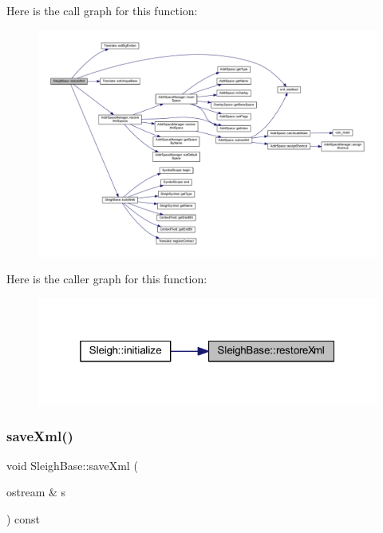 Here is the call graph for this function\+:
\nopagebreak
\begin{figure}[H]
\begin{center}
\leavevmode
\includegraphics[width=350pt]{class_sleigh_base_a4f2cd05135b68d2bafb549cfe87d3be5_cgraph}
\end{center}
\end{figure}
Here is the caller graph for this function\+:
\nopagebreak
\begin{figure}[H]
\begin{center}
\leavevmode
\includegraphics[width=319pt]{class_sleigh_base_a4f2cd05135b68d2bafb549cfe87d3be5_icgraph}
\end{center}
\end{figure}
\mbox{\label{class_sleigh_base_a2231c60a93b577e7bd844b97ac0ef60f}} 
\subsubsection{\texorpdfstring{saveXml()}{saveXml()}}
{\footnotesize\ttfamily void Sleigh\+Base\+::save\+Xml (\begin{DoxyParamCaption}\item[{ostream \&}]{s }\end{DoxyParamCaption}) const}




